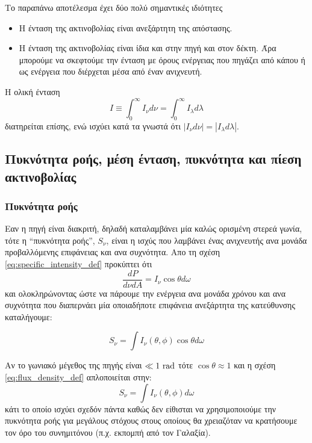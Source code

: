 Το παραπάνω αποτέλεσμα έχει δύο πολύ σημαντικές ιδιότητες
\begin{itemize}
    \item Η ένταση της ακτινοβολίας είναι ανεξάρτητη της απόστασης.
    \item Η ένταση της ακτινοβολίας είναι ίδια και στην πηγή και στον δέκτη. Άρα μπορούμε να σκεφτούμε την ένταση με όρους ενέργειας που πηγάζει από κάπου ή ως ενέργεια που διέρχεται μέσα από έναν ανιχνευτή.
\end{itemize}

Η ολική ένταση 
\begin{equation}
    I \equiv \int_{0}^{\infty} I_{\nu} d\nu = \int_{0}^{\infty} I_{\lambda} d\lambda
\end{equation}
διατηρείται επίσης, ενώ ισχύει κατά τα γνωστά ότι $|I_{\nu} d\nu| = |I_{\lambda} d\lambda|$.




\subsection{Πυκνότητα ροής, μέση ένταση, πυκνότητα και πίεση ακτινοβολίας}

\subsubsection{Πυκνότητα ροής}
Εαν η πηγή είναι διακριτή, δηλαδή καταλαμβάνει μία καλώς ορισμένη στερεά γωνία, τότε η ``πυκνότητα ροής'', $S_{\nu}$,  είναι η ισχύς που λαμβάνει ένας ανιχνευτής ανα μονάδα προβαλλόμενης επιφάνειας και ανα συχνότητα. 
Απο τη σχέση \eqref{eq:specific_intensity_def} προκύπτει ότι
\begin{equation*}
    \frac{dP}{d\nu dA} = I_{\nu} \cos \theta d\omega
\end{equation*}
και ολοκληρώνοντας ώστε να πάρουμε την ενέργεια ανα μονάδα χρόνου και ανα συχνότητα που διαπερνάει μία οποιαδήποτε επιφάνεια ανεξάρτητα της κατεύθυνσης καταλήγουμε:

\begin{equation}
    \label{eq:flux_density_def}
    S_{\nu} = \int I_{\nu}(\theta, \phi) \cos \theta d\omega
\end{equation}

Αν το γωνιακό μέγεθος της πηγής είναι $\ll 1 \ \rm rad$ τότε $\cos \theta \approx 1$ και η σχέση \eqref{eq:flux_density_def} απλοποιείται στην:
\begin{equation}
    \label{eq:flux_density_simple}
    S_{\nu} = \int I_{\nu}(\theta, \phi) d\omega
\end{equation}
κάτι το οποίο ισχύει σχεδόν πάντα καθώς δεν είθισται να χρησιμοποιούμε την πυκνότητα ροής για μεγάλους στόχους στους οποίους θα χρειαζόταν να κρατήσουμε τον όρο του συνημιτόνου (π.χ. εκπομπή από τον Γαλαξία).\\


